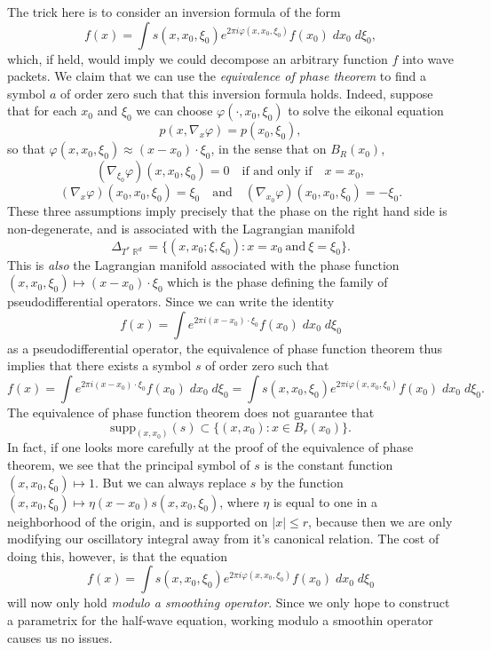 \documentclass{article}
\theoremstyle{plain}
\theoremstyle{remark}
\theoremstyle{definition}
\DeclareMathOperator{\RR}{\mathbb{R}}
\begin{document}
The trick here is to consider an inversion formula of the form
%
\[ f(x) = \int s(x,x_0,\xi_0) e^{2 \pi i \varphi(x,x_0,\xi_0)} f(x_0)\; dx_0\; d\xi_0, \]
%
which, if held, would imply we could decompose an arbitrary function $f$ into wave packets. We claim that we can use the \emph{equivalence of phase theorem} to find a symbol $a$ of order zero such that this inversion formula holds. Indeed, suppose that for each $x_0$ and $\xi_0$ we can choose $\varphi(\cdot,x_0,\xi_0)$ to solve the eikonal equation
%
\[ p(x,\nabla_x \varphi) = p(x_0,\xi_0), \]
%
so that $\varphi(x,x_0,\xi_0) \approx (x - x_0) \cdot \xi_0$, in the sense that on $B_R(x_0)$,
%
\[ (\nabla_{\xi_0} \varphi)(x,x_0,\xi_0) = 0 \quad\text{if and only if}\quad x = x_0, \]
%
\[ (\nabla_x \varphi)(x_0,x_0,\xi_0) = \xi_0 \quad\text{and}\quad (\nabla_{x_0} \varphi)(x_0,x_0,\xi_0) = - \xi_0. \]
%
These three assumptions imply precisely that the phase on the right hand side is non-degenerate, and is associated with the Lagrangian manifold
%
\[ \Delta_{T^* \RR^d} = \Big\{ (x,x_0;\xi,\xi_0): x = x_0\ \text{and}\ \xi = \xi_0 \Big\}. \]
%
This is \emph{also} the Lagrangian manifold associated with the phase function $(x,x_0,\xi_0) \mapsto (x - x_0) \cdot \xi_0$ which is the phase defining the family of pseudodifferential operators. Since we can write the identity
%
\[ f(x) = \int e^{2 \pi i (x - x_0) \cdot \xi_0} f(x_0)\; dx_0\; d\xi_0 \]
%
as a pseudodifferential operator, the equivalence of phase function theorem thus implies that there exists a symbol $s$ of order zero such that
%
\[ f(x) = \int e^{2 \pi i (x - x_0) \cdot \xi_0} f(x_0)\; dx_0\; d\xi_0 = \int s(x,x_0,\xi_0) e^{2 \pi i \varphi(x,x_0,\xi_0)} f(x_0)\; dx_0\; d\xi_0. \]
%
The equivalence of phase function theorem does not guarantee that
%
\[ \text{supp}_{(x,x_0)}(s) \subset \{ (x,x_0) : x \in B_r(x_0) \}. \]
%
In fact, if one looks more carefully at the proof of the equivalence of phase theorem, we see that the principal symbol of $s$ is the constant function $(x,x_0,\xi_0) \mapsto 1$. But we can always replace $s$ by the function $(x,x_0,\xi_0) \mapsto \eta(x - x_0) s(x,x_0,\xi_0)$, where $\eta$ is equal to one in a neighborhood of the origin, and is supported on $|x| \leq r$, because then we are only modifying our oscillatory integral away from it's canonical relation. The cost of doing this, however, is that the equation
%
\[ f(x) = \int s(x,x_0,\xi_0) e^{2 \pi i \varphi(x,x_0,\xi_0)} f(x_0)\; dx_0\; d\xi_0 \]
%
will now only hold \emph{modulo a smoothing operator}. Since we only hope to construct a parametrix for the half-wave equation, working modulo a smoothin operator causes us no issues.
\end{document}

